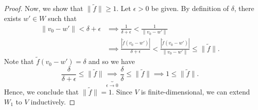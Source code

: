 \documentclass[a4paper]{article}
\begin{document}
\begin{enumerate}
\begin{proof}
            Now, we show that \( \|\tilde{f}\| \geq 1 \). Let \( \epsilon > 0  \) be given. By definition of \( \delta \), there exists \( w' \in W  \) such that 
            \begin{align*}
                \|{v}_{0} - w' \| < \delta + \epsilon &\implies \frac{ 1 }{ \delta + \epsilon  }  < \frac{ 1  }{  \|{v}_{0} - w'\| }  \\
                                                      &\implies \frac{ | \tilde{f}({v}_{0} - w') |  }{ \delta + \epsilon  }  < \frac{ | \tilde{f}({v}_{0} -w') |   }{ \|{v}_{0} -w'\| } \leq \|\tilde{f}\|.
            \end{align*}
            Note that \( \tilde{f}({v}_{0} - w') = \delta \) and so we have 
            \[  \frac{ \delta }{ \delta + \epsilon }  \leq \|\tilde{f}\| \underbrace{\implies}_{\epsilon \to 0} \frac{ \delta }{ \delta  } \leq \|\tilde{f}\| \implies 1 \leq \|\tilde{f}\|. \]
            Hence, we conclude that \( \|\tilde{f}\| = 1  \). Since \( V  \) is finite-dimensional, we can extend \( {W}_{1} \) to \( V  \) inductively.
        \end{proof}
\end{enumerate}
\end{document}
